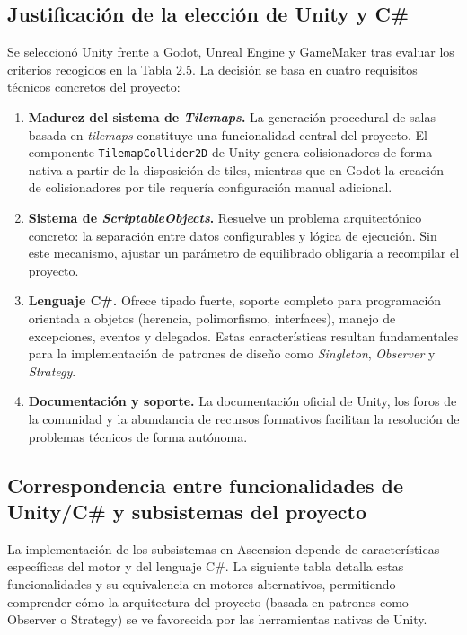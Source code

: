 \subsection{Justificación de la elección de Unity y C\#}


Se seleccionó Unity frente a Godot, Unreal Engine y GameMaker tras evaluar los criterios recogidos en la Tabla 2.5. La decisión se basa en cuatro requisitos técnicos concretos del proyecto:

\begin{enumerate}
\item \textbf{Madurez del sistema de \textit{Tilemaps}.} La generación procedural de salas basada en \textit{tilemaps} constituye una funcionalidad central del proyecto. El componente \texttt{Tilemap\allowbreak Collider\allowbreak 2D} de Unity genera colisionadores de forma nativa a partir de la disposición de tiles, mientras que en Godot la creación de colisionadores por tile requería configuración manual adicional.
\item \textbf{Sistema de \textit{ScriptableObjects}.} Resuelve un problema arquitectónico concreto: la separación entre datos configurables y lógica de ejecución. Sin este mecanismo, ajustar un parámetro de equilibrado obligaría a recompilar el proyecto.
\item \textbf{Lenguaje C\#.} Ofrece tipado fuerte, soporte completo para programación orientada a objetos (herencia, polimorfismo, interfaces), manejo de excepciones, eventos y delegados. Estas características resultan fundamentales para la implementación de patrones de diseño como \textit{Singleton}, \textit{Observer} y \textit{Strategy}.
\item \textbf{Documentación y soporte.} La documentación oficial de Unity, los foros de la comunidad y la abundancia de recursos formativos facilitan la resolución de problemas técnicos de forma autónoma.
\end{enumerate}

\subsection{Correspondencia entre funcionalidades de Unity/C\# y subsistemas del proyecto}


La implementación de los subsistemas en Ascension depende de características específicas del motor y del lenguaje C\#. La siguiente tabla detalla estas funcionalidades y su equivalencia en motores alternativos, permitiendo comprender cómo la arquitectura del proyecto (basada en patrones como Observer o Strategy) se ve favorecida por las herramientas nativas de Unity.


